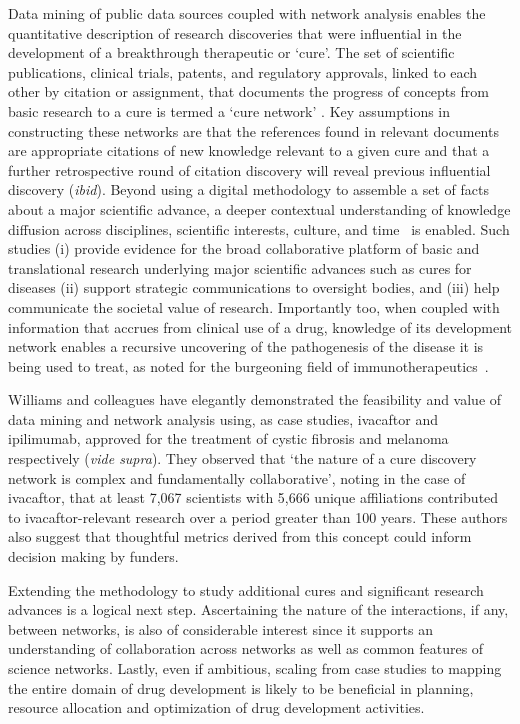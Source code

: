 \documentclass[10pt,letterpaper]{article}
\begin{document}
Data mining of public data sources coupled with network analysis enables the quantitative description of research discoveries that were influential in the development of a breakthrough therapeutic or `cure'.  The set of scientific publications, clinical trials, patents, and regulatory approvals, linked to each other by citation or assignment, that documents the progress of concepts from basic research to a cure is termed a `cure network' \cite {bibWilliams}. Key assumptions in constructing these networks are that the references found in relevant documents are appropriate citations of new knowledge relevant to a given cure and that a further retrospective round of citation discovery will reveal previous influential discovery (\textit{ibid}). Beyond using a digital methodology to assemble a set of facts about a major scientific advance, a deeper contextual understanding of knowledge diffusion across disciplines, scientific interests, culture, and time~\cite{bibMaldame} is enabled. Such studies (i) provide evidence for the broad collaborative platform of basic and translational research underlying major scientific advances such as cures for diseases \cite {bibLauer} (ii) support strategic communications to oversight bodies, and (iii) help communicate the societal value of research. Importantly too, when coupled with information that accrues from clinical use of a drug, knowledge of its development network enables a recursive uncovering of the pathogenesis of the disease it is being used to treat, as noted for the burgeoning field of immunotherapeutics~\cite{bibChan}. 

Williams and colleagues have elegantly demonstrated the feasibility and value of data mining and network analysis using, as case studies, ivacaftor and ipilimumab, approved for the treatment of cystic fibrosis and melanoma respectively (\textit{vide supra}). They observed that `the nature of a cure discovery network is complex and fundamentally collaborative', noting in the case of ivacaftor, that at least 7,067 scientists with 5,666 unique affiliations contributed to ivacaftor-relevant research over a period greater than 100 years. These authors also suggest that thoughtful metrics derived from this concept could inform decision making by funders.

Extending the methodology to study additional cures and significant research advances is a logical next step. Ascertaining the nature of the interactions, if any, between networks, is also of considerable interest since it supports an understanding of collaboration across networks as well as common features of science networks. Lastly, even if ambitious, scaling from case studies to mapping the entire domain of drug development is likely to be beneficial in planning, resource allocation and optimization of drug development activities. 
\end{document}
